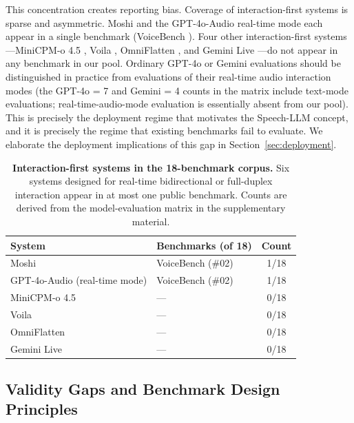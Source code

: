 This concentration creates reporting bias. Coverage of interaction-first
systems is sparse and asymmetric. Moshi \citep{defossez2024moshi}
and the GPT-4o-Audio real-time mode each appear in a single benchmark
(VoiceBench \citep{chen2024voicebench}). Four other interaction-first
systems---MiniCPM-o 4.5 \citep{cui2026minicpmo}, Voila
\citep{shi2025voila}, OmniFlatten \citep{zhang2025omniflatten}, and
Gemini Live \citep{google2024gemini}---do not appear in any benchmark
in our pool.
Ordinary GPT-4o or Gemini evaluations should be distinguished in
practice from evaluations of their real-time audio interaction
modes (the GPT-4o = 7 and Gemini = 4 counts in the matrix include
text-mode evaluations; real-time-audio-mode evaluation is essentially
absent from our pool). This is precisely the deployment regime that
motivates the Speech-LLM concept, and it is precisely the regime that
existing benchmarks fail to evaluate. We elaborate the deployment
implications of this gap in Section~\ref{sec:deployment}.

\begin{table}[!ht]
\centering
\caption{\textbf{Interaction-first systems in the 18-benchmark corpus.}
Six systems designed for real-time bidirectional or full-duplex
interaction appear in at most one public benchmark. Counts are derived
from the model-evaluation matrix in the supplementary material.}
\label{tab:interaction_first_coverage}
\footnotesize
\setlength{\tabcolsep}{5pt}
\renewcommand{\arraystretch}{1.2}
\begin{tabular}{@{}llc@{}}
\toprule
\textbf{System} & \textbf{Benchmarks (of 18)} & \textbf{Count} \\
\midrule
Moshi                          & VoiceBench (\#02) & 1/18 \\
GPT-4o-Audio (real-time mode)  & VoiceBench (\#02) & 1/18 \\
MiniCPM-o 4.5                  & ---               & 0/18 \\
Voila                          & ---               & 0/18 \\
OmniFlatten                    & ---               & 0/18 \\
Gemini Live                    & ---               & 0/18 \\
\bottomrule
\end{tabular}
\end{table}

\subsection{Validity Gaps and Benchmark Design Principles}
\label{subsec:eval_gaps}

